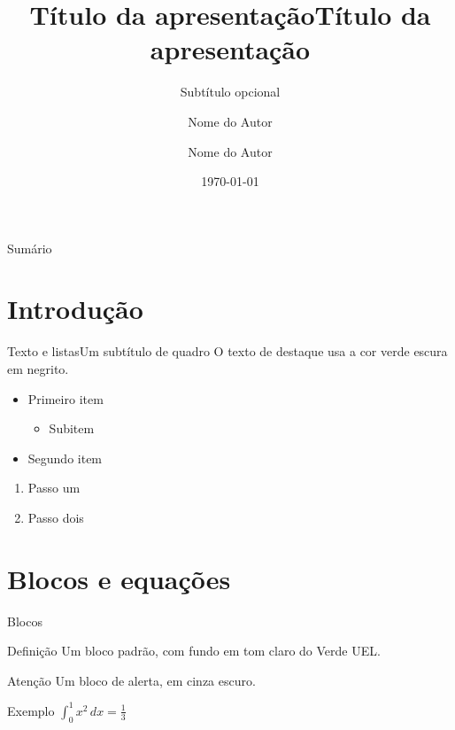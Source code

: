 \documentclass[aspectratio=169,10pt]{beamer}
\title{Título da apresentação}
\subtitle{Subtítulo opcional}
\author{Nome do Autor}
\institute{Departamento de Computação\\Universidade Estadual de Londrina}
\date{\today}
\title[Título curto]{Título da apresentação}
\author[Nome do Autor]{Nome do Autor}
\begin{document}
\maketitle

\begin{frame}{Sumário}
  \tableofcontents
\end{frame}

\section{Introdução}

\begin{frame}{Texto e listas}{Um subtítulo de quadro}
  O \alert{texto de destaque} usa a cor verde escura em negrito.
  \begin{itemize}
    \item Primeiro item
    \begin{itemize}
      \item Subitem
    \end{itemize}
    \item Segundo item
  \end{itemize}
  \begin{enumerate}
    \item Passo um
    \item Passo dois
  \end{enumerate}
\end{frame}

\section{Blocos e equações}

\begin{frame}{Blocos}
  \begin{block}{Definição}
    Um bloco padrão, com fundo em tom claro do Verde UEL.
  \end{block}
  \begin{alertblock}{Atenção}
    Um bloco de alerta, em cinza escuro.
  \end{alertblock}
  \begin{exampleblock}{Exemplo}
    $\displaystyle \int_0^1 x^2\,dx = \frac{1}{3}$
  \end{exampleblock}
\end{frame}
\end{document}
